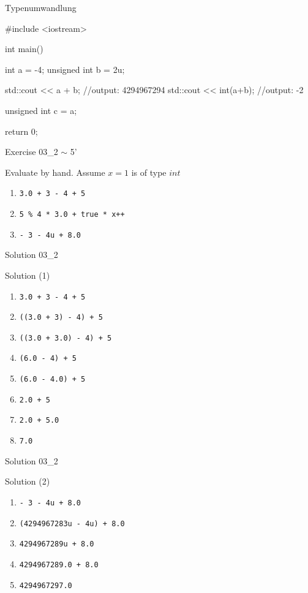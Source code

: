 \ifnum\conditionmacro=1 \documentclass[handout,usenames,dvipsnames]{beamer}\fi
\begin{document}
\begin{frame}[fragile]{Typenumwandlung}
\begin{TFCpp}
#include <iostream>

int main()
{
   int a = -4;
   unsigned int b = 2u;

   std::cout << a + b; //output: 4294967294
   std::cout << int(a+b); //output: -2
   
   unsigned int c = a;

   return 0;
}
\end{TFCpp}
\end{frame}

\begin{frame}[fragile]{Exercise 03\_2 $\sim$ 5'}
\begin{block}{Evaluate by hand. Assume $x = 1$ is of type $int$}
\begin{enumerate}
\item \verb,3.0 + 3 - 4 + 5,
\item \verb,5 % 4 * 3.0 + true * x++,
\item \verb,- 3 - 4u + 8.0,
\end{enumerate}
\end{block}
\end{frame}

\begin{frame}[fragile]{Solution 03\_2}
\begin{block}{Solution (1)}
\begin{enumerate}
\item \verb,3.0 + 3 - 4 + 5,
\item<2-> \verb,((3.0 + 3) - 4) + 5,
\item<3-> \verb,((3.0 + 3.0) - 4) + 5,
\item<4-> \verb,(6.0 - 4) + 5,
\item<5-> \verb,(6.0 - 4.0) + 5,
\item<6-> \verb,2.0 + 5,
\item<7-> \verb,2.0 + 5.0,
\item<8-> \verb,7.0,
\end{enumerate}
\end{block}
\end{frame}


\begin{frame}[fragile]{Solution 03\_2}
\begin{block}{Solution (2)}
\begin{enumerate}
\item \verb,- 3 - 4u + 8.0,
\item<2-> \verb,(4294967283u - 4u) + 8.0,
\item<3-> \verb,4294967289u + 8.0,
\item<4-> \verb,4294967289.0 + 8.0,
\item<5-> \verb,4294967297.0,
\end{enumerate}
\end{block}
\end{frame}
\end{document}
